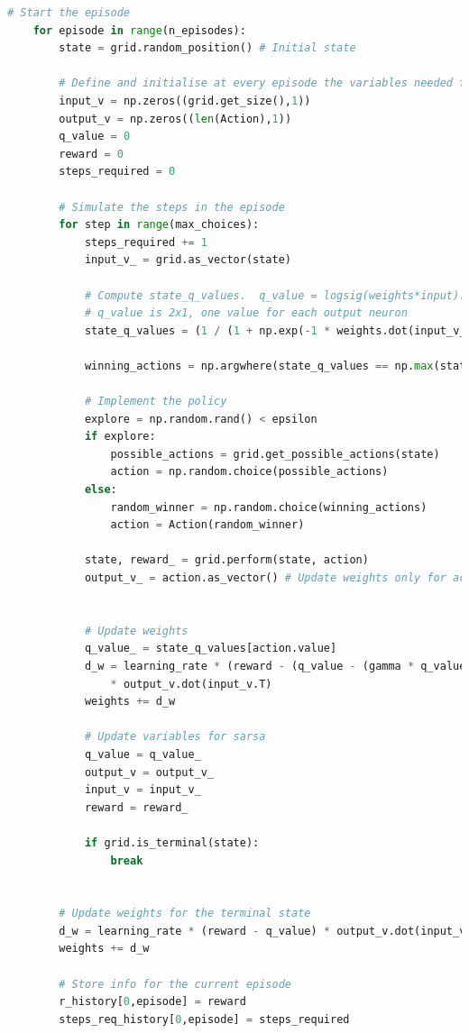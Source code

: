\documentclass[11pt,journal,transmag,final]{IEEEtran}
\begin{document}
\begin{appendices}
\begin{lstlisting}[language=Python, caption=SARSA Algorithm Implementation, basicstyle=\footnotesize, label=lst:sarsa]
    # Start the episode
    for episode in range(n_episodes):
        state = grid.random_position() # Initial state

        # Define and initialise at every episode the variables needed for SARSA
        input_v = np.zeros((grid.get_size(),1))
        output_v = np.zeros((len(Action),1))
        q_value = 0
        reward = 0
        steps_required = 0

        # Simulate the steps in the episode
        for step in range(max_choices):
            steps_required += 1
            input_v_ = grid.as_vector(state)
            
            # Compute state_q_values.  q_value = logsig(weights*input).
            # q_value is 2x1, one value for each output neuron
            state_q_values = (1 / (1 + np.exp(-1 * weights.dot(input_v_)))).flatten()
            
            winning_actions = np.argwhere(state_q_values == np.max(state_q_values)).flatten()

            # Implement the policy
            explore = np.random.rand() < epsilon
            if explore:
                possible_actions = grid.get_possible_actions(state)
                action = np.random.choice(possible_actions)
            else:
                random_winner = np.random.choice(winning_actions)
                action = Action(random_winner)

            state, reward_ = grid.perform(state, action)
            output_v_ = action.as_vector() # Update weights only for action selected.
            
            
            # Update weights
            q_value_ = state_q_values[action.value]
            d_w = learning_rate * (reward - (q_value - (gamma * q_value_)))
                * output_v.dot(input_v.T)
            weights += d_w

            # Update variables for sarsa
            q_value = q_value_
            output_v = output_v_
            input_v = input_v_
            reward = reward_
            
            if grid.is_terminal(state):
                break
            

        # Update weights for the terminal state
        d_w = learning_rate * (reward - q_value) * output_v.dot(input_v.T)
        weights += d_w

        # Store info for the current episode
        r_history[0,episode] = reward
        steps_req_history[0,episode] = steps_required


\end{lstlisting}
\end{appendices}
\end{document}
